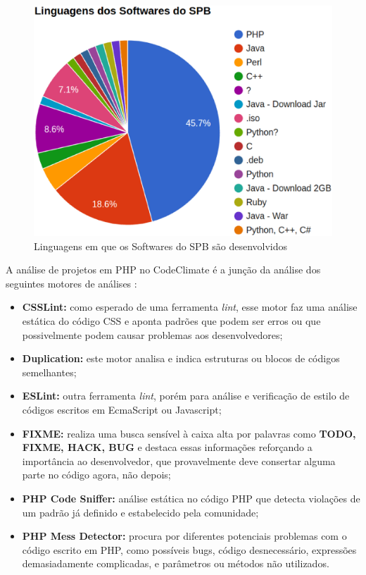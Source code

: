 \begin{figure}[!htb]
	\centering
    \includegraphics[keepaspectratio=true,scale=0.5]
    {figuras/linguagens_softwares_spb.eps}
  \caption{Linguagens em que os Softwares do SPB são desenvolvidos}
  \label{fig:linguagens_softwares_spb}
\end{figure}

\newpage


A análise de projetos em PHP no CodeClimate é a junção da análise dos seguintes
motores de análises \cite{enginesCodeClimate}:

\begin{itemize}
  \item \textbf{CSSLint:} como esperado de uma ferramenta \textit{lint}, esse
	motor faz uma análise estática do código CSS e aponta padrões que podem ser
	erros ou que possivelmente podem causar problemas aos desenvolvedores;
	\item \textbf{Duplication:} este motor analisa e indica estruturas ou blocos
	de códigos semelhantes;
	\item \textbf{ESLint:} outra ferramenta \textit{lint}, porém para análise e
	verificação de estilo de códigos escritos em EcmaScript ou Javascript;
	\item \textbf{FIXME:} realiza uma busca sensível à caixa alta por palavras
	como \textbf{TODO, FIXME, HACK, BUG} e destaca essas informações reforçando a
	importância ao desenvolvedor, que provavelmente deve consertar alguma parte no
	código agora, não depois;
	\item \textbf{PHP Code Sniffer:} análise estática no código PHP que detecta
	violações de um padrão já definido e estabelecido pela comunidade;
	\item \textbf{PHP Mess Detector:} procura por diferentes potenciais problemas
	com o código escrito em PHP, como possíveis bugs, código desnecessário,
	expressões demasiadamente complicadas, e parâmetros ou métodos não utilizados.
\end{itemize}

